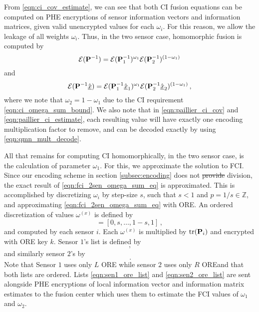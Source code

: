 \documentclass[letterpaper, 10 pt, journal, twoside]{ieeetran}  %
\providecommand{\DIFadd}[1]{{\protect\color{blue}\uwave{#1}}} %
\providecommand{\DIFdel}[1]{{\protect\color{red}\sout{#1}}}                      %
\providecommand{\DIFaddbegin}{} %
\providecommand{\DIFaddend}{} %
\providecommand{\DIFdelbegin}{} %
\providecommand{\DIFdelend}{} %
\begin{document}
From \eqref{eqn:ci_cov_estimate}, we can see that both CI fusion equations can be computed on PHE encryptions of sensor information vectors and information matrices, given valid unencrypted values for each $\omega_i$. For this reason, we allow the leakage of all weights $\omega_i$. Thus, in the two sensor case, homomorphic fusion is computed by
\begin{equation}
   \mathcal{E}({{\mathbf{P}}}^{-1}) = \mathcal{E}({{\mathbf{P}}}^{-1}_1)^{\omega_1}\mathcal{E}({{\mathbf{P}}}^{-1}_2)^{(1 -\omega_1)} \label{eqn:paillier_ci_cov}
\end{equation}
and
\begin{equation}
   \mathcal{E}({{\mathbf{P}}}^{-1}\hat{{\underline{x}}}) = \mathcal{E}({{\mathbf{P}}}^{-1}_1\hat{{\underline{x}}}_1)^{\omega_1}\mathcal{E}({{\mathbf{P}}}^{-1}_2\hat{{\underline{x}}}_2)^{(1 - \omega_1)}\,, \label{eqn:paillier_ci_estimate}
\end{equation}
where we note that $\omega_2=1-\omega_1$ due to the CI requirement \eqref{eqn:ci_omega_sum_bound}. We also note that in \eqref{eqn:paillier_ci_cov} and \eqref{eqn:paillier_ci_estimate}, each resulting value will have exactly one encoding multiplication factor to remove, and can be decoded exactly by using \eqref{eqn:qmn_mult_decode}.

All that remains for computing CI homomorphically, in the two sensor case, is the calculation of parameter $\omega_1$. For this, we approximate the solution to FCI. Since our encoding scheme in section \ref{subsec:encoding} does not \DIFdelbegin \DIFdel{provide }\DIFdelend \DIFaddbegin \DIFadd{allow }\DIFaddend division, the exact result of \eqref{eqn:fci_2sen_omega_sum_eq} is approximated. This is accomplished by discretizing $\omega_i$ by step-size $s$, such that $s<1$ and $p=1/s \in \mathbb{Z}$, and approximating \eqref{eqn:fci_2sen_omega_sum_eq} with ORE. An ordered discretization of values $\omega^{(x)}$ is defined by
\begin{equation}
   [\omega^{(1)},\dots,\omega^{(p)}] = [0,s,\dots,1-s,1]\,,
\end{equation}
and computed by each sensor $i$. Each $\omega^{(x)}$ is multiplied by $\operatorname{tr}({{\mathbf{P}}}_i)$ and encrypted with ORE key $k$. Sensor $1$'s list is defined by 
\begin{equation}
   [\mathcal{E}^L_{ORE}(\omega^{(1)}\tr(\mP_1)),\dots,\mathcal{E}^L_{ORE}(\omega^{(p)}\tr(\mP_1))]\,, \label{eqn:sen1_ore_list}
\end{equation}
and similarly sensor $2$'s by
\begin{equation}
   [\mathcal{E}^R_{ORE}(\omega^{(1)}\tr(\mP_2)),\dots,\mathcal{E}^R_{ORE}(\omega^{(p)}\tr(\mP_2))]\,. \label{eqn:sen2_ore_list}
\end{equation}
Note that Sensor $1$ uses only $L$ ORE while sensor $2$ uses only $R$ ORE\DIFaddbegin \DIFadd{, }\DIFaddend and that both lists are ordered. Lists \eqref{eqn:sen1_ore_list} and \eqref{eqn:sen2_ore_list} are sent alongside PHE encryptions of local information vector and information matrix estimates to the fusion center which uses them to estimate the FCI values of $\omega_1$ and $\omega_2$.
\end{document}
